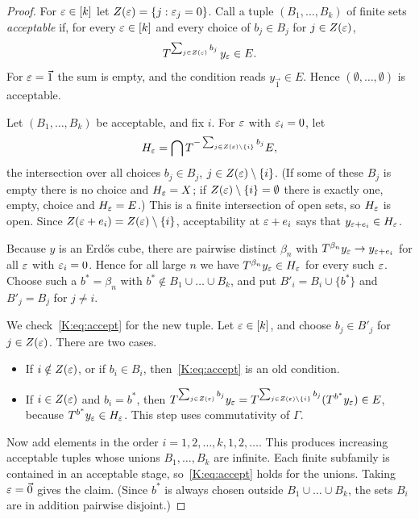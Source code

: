 \begin{proof}
For $\varepsilon\in[k]$ let $Z(\varepsilon)=\{j:\varepsilon_j=0\}$.
Call a tuple $(B_1,\dots,B_k)$ of finite sets \emph{acceptable} if, for every $\varepsilon\in[k]$
and every choice of $b_j\in B_j$ for $j\in Z(\varepsilon)$,
\begin{equation}\label{K:eq:accept}
T^{\sum_{j\in Z(\varepsilon)}b_j}\,y_\varepsilon\in E .
\end{equation}
For $\varepsilon=\vec1$ the sum is empty, and the condition reads $y_{\vec1}\in E$.
Hence $(\emptyset,\dots,\emptyset)$ is acceptable.

Let $(B_1,\dots,B_k)$ be acceptable, and fix $i$.
For $\varepsilon$ with $\varepsilon_i=0$, let
\[
H_\varepsilon=\bigcap T^{-\sum_{j\in Z(\varepsilon)\setminus\{i\}}b_j}E ,
\]
the intersection over all choices $b_j\in B_j$, $j\in Z(\varepsilon)\setminus\{i\}$. (If some of
these $B_j$ is empty there is no choice and $H_\varepsilon=X$; if $Z(\varepsilon)\setminus\{i\}=\emptyset$
there is exactly one, empty, choice and $H_\varepsilon=E$.)
This is a finite intersection of open sets, so $H_\varepsilon$ is open.
Since $Z(\varepsilon+e_i)=Z(\varepsilon)\setminus\{i\}$, acceptability at $\varepsilon+e_i$ says that
$y_{\varepsilon+e_i}\in H_\varepsilon$.

Because $y$ is an Erdős cube, there are pairwise distinct $\beta_n$ with
$T^{\beta_n}y_\varepsilon\to y_{\varepsilon+e_i}$ for all $\varepsilon$ with $\varepsilon_i=0$.
Hence for all large $n$ we have $T^{\beta_n}y_\varepsilon\in H_\varepsilon$ for every such $\varepsilon$.
Choose such a $b^*=\beta_n$ with $b^*\notin B_1\cup\dots\cup B_k$, and put $B'_i=B_i\cup\{b^*\}$ and $B'_j=B_j$
for $j\ne i$.

We check~\eqref{K:eq:accept} for the new tuple. Let $\varepsilon\in[k]$, and choose $b_j\in B'_j$
for $j\in Z(\varepsilon)$. There are two cases.
\begin{itemize}
\item If $i\notin Z(\varepsilon)$, or if $b_i\in B_i$, then~\eqref{K:eq:accept} is an old condition.
\item If $i\in Z(\varepsilon)$ and $b_i=b^*$, then
$T^{\sum_{j\in Z(\varepsilon)}b_j}y_\varepsilon=T^{\sum_{j\in Z(\varepsilon)\setminus\{i\}}b_j}(T^{b^*}y_\varepsilon)\in E$,
because $T^{b^*}y_\varepsilon\in H_\varepsilon$. This step uses commutativity of $\Gamma$.
\end{itemize}

Now add elements in the order $i=1,2,\dots,k,1,2,\dots$.
This produces increasing acceptable tuples whose unions $B_1,\dots,B_k$ are infinite.
Each finite subfamily is contained in an acceptable stage, so~\eqref{K:eq:accept} holds for
the unions. Taking $\varepsilon=\vec0$ gives the claim. (Since $b^*$ is always chosen outside
$B_1\cup\dots\cup B_k$, the sets $B_i$ are in addition pairwise disjoint.)
\end{proof}

